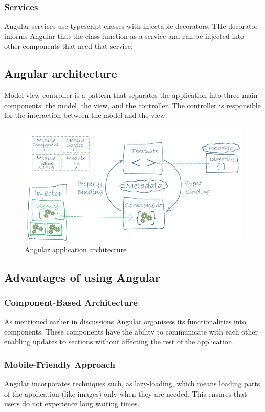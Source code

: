 \subsubsection{Services} Angular services use typescript classes with injectable decorators. THe decorator informs Angular that the class function as a service
and can be injected into other components that need that service.\cite{angular-services}
\subsection{Angular architecture}
Model-view-controller is a pattern that separates the application into three main components: the model, the view, and the controller. 
The controller is responsible for the interaction between the model and the view.

\begin{figure}[ht]
    \centering
    \includegraphics[width=0.85\linewidth]{images/angular-arch.png}
    \caption{Angular application architecture}
    \label{fig:angular-arch}
\end{figure}

\subsection{Advantages of using Angular}
\subsubsection{Component-Based Architecture}
As mentioned earlier in discussions Angular organisess its functionalities into components. These components have the ability to communicate with each other enabling updates to sections without affecting the rest of the application.

\subsubsection{Mobile-Friendly Approach}
Angular incorporates techniques such, as lazy-loading, which means loading parts of the application (like images) only when they are needed. This ensures that users do not experience long waiting times.

